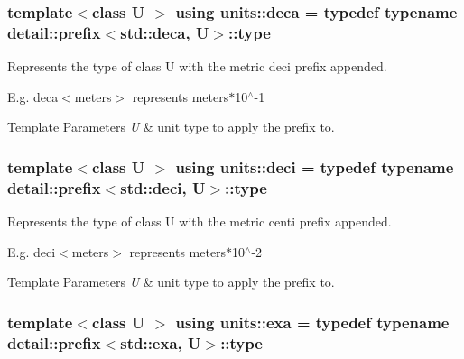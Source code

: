 \subsubsection[{deca}]{\setlength{\rightskip}{0pt plus 5cm}template$<$class U $>$ using {\bf units\+::deca} = typedef typename detail\+::prefix$<$std\+::deca, U$>$\+::type}\label{group___unit_manipulators_ga610922a1098c1f783d7c6972bbfe59f8}


Represents the type of {\ttfamily class U} with the metric \textquotesingle{}deci\textquotesingle{} prefix appended. 

E.\+g. deca$<$meters$>$ represents meters$\ast$10$^\wedge$-\/1 
\begin{DoxyTemplParams}{Template Parameters}
{\em U} & unit type to apply the prefix to. \\
\hline
\end{DoxyTemplParams}
\hypertarget{group___unit_manipulators_ga21c21d358600828a0a49380d9df693b9}{}
\subsubsection[{deci}]{\setlength{\rightskip}{0pt plus 5cm}template$<$class U $>$ using {\bf units\+::deci} = typedef typename detail\+::prefix$<$std\+::deci, U$>$\+::type}\label{group___unit_manipulators_ga21c21d358600828a0a49380d9df693b9}


Represents the type of {\ttfamily class U} with the metric \textquotesingle{}centi\textquotesingle{} prefix appended. 

E.\+g. deci$<$meters$>$ represents meters$\ast$10$^\wedge$-\/2 
\begin{DoxyTemplParams}{Template Parameters}
{\em U} & unit type to apply the prefix to. \\
\hline
\end{DoxyTemplParams}
\hypertarget{group___unit_manipulators_gad0c18c5a47e0fe677715f0328f818515}{}
\subsubsection[{exa}]{\setlength{\rightskip}{0pt plus 5cm}template$<$class U $>$ using {\bf units\+::exa} = typedef typename detail\+::prefix$<$std\+::exa, U$>$\+::type}\label{group___unit_manipulators_gad0c18c5a47e0fe677715f0328f818515}


